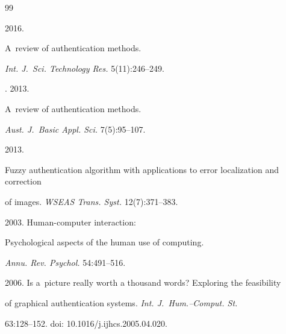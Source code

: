 




{\small\frenchspacing


{%




\begin{thebibliography}{99}







 2016. 


A~review of authentication methods. 


\textit{Int. J.~Sci.  Technology Res.} 5(11):246--249.




. 2013. 


A~review of authentication methods. 


\textit{Aust. J.~Basic Appl. Sci.} 7(5):95--107.




 2013. 


Fuzzy authentication algorithm with applications to error localization and correction 


of images. \textit{WSEAS Trans. Syst.} 12(7):371--383.







  2003. Human-computer interaction: 


Psychological aspects of the human use of computing. 


\textit{Annu. Rev. Psychol.} 54:491--516.









2006. Is a~picture really worth a thousand words? Exploring the feasibility 


of graphical authentication systems. \textit{Int. J.~Hum.--Comput. St.} 


63:128--152. doi: 10.1016\!/\!j.ijhcs.2005.04.020.



\end{thebibliography}}}
